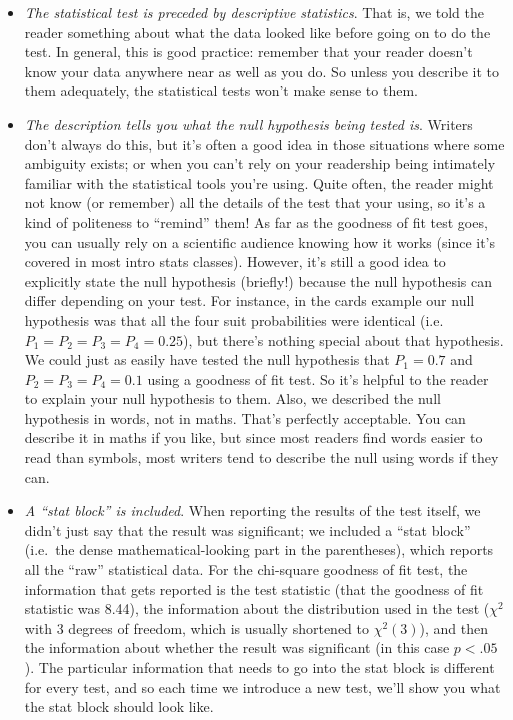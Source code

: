 \documentclass[
]{book}
\providecommand{\tightlist}{%
  \setlength{\itemsep}{0pt}\setlength{\parskip}{0pt}}
\theoremstyle{definition}
\theoremstyle{definition}
\theoremstyle{definition}
\theoremstyle{definition}
\theoremstyle{remark}
\begin{document}
\begin{itemize}
\tightlist
\item
  \emph{The statistical test is preceded by descriptive statistics}. That is, we told the reader something about what the data looked like before going on to do the test. In general, this is good practice: remember that your reader doesn't know your data anywhere near as well as you do. So unless you describe it to them adequately, the statistical tests won't make sense to them.
\item
  \emph{The description tells you what the null hypothesis being tested is}. Writers don't always do this, but it's often a good idea in those situations where some ambiguity exists; or when you can't rely on your readership being intimately familiar with the statistical tools you're using. Quite often, the reader might not know (or remember) all the details of the test that your using, so it's a kind of politeness to ``remind'' them! As far as the goodness of fit test goes, you can usually rely on a scientific audience knowing how it works (since it's covered in most intro stats classes). However, it's still a good idea to explicitly state the null hypothesis (briefly!) because the null hypothesis can differ depending on your test. For instance, in the cards example our null hypothesis was that all the four suit probabilities were identical (i.e.~\(P_1 = P_2 = P_3 = P_4 = 0.25\)), but there's nothing special about that hypothesis. We could just as easily have tested the null hypothesis that \(P_1 = 0.7\) and \(P_2 = P_3 = P_4 = 0.1\) using a goodness of fit test. So it's helpful to the reader to explain your null hypothesis to them. Also, we described the null hypothesis in words, not in maths. That's perfectly acceptable. You can describe it in maths if you like, but since most readers find words easier to read than symbols, most writers tend to describe the null using words if they can.
\item
  \emph{A ``stat block'' is included}. When reporting the results of the test itself, we didn't just say that the result was significant; we included a ``stat block'' (i.e.~the dense mathematical-looking part in the parentheses), which reports all the ``raw'' statistical data. For the chi-square goodness of fit test, the information that gets reported is the test statistic (that the goodness of fit statistic was 8.44), the information about the distribution used in the test (\(\chi^2\) with 3 degrees of freedom, which is usually shortened to \(\chi^2(3)\)), and then the information about whether the result was significant (in this case \(p<.05\)). The particular information that needs to go into the stat block is different for every test, and so each time we introduce a new test, we'll show you what the stat block should look like.

\end{itemize}
\end{document}
